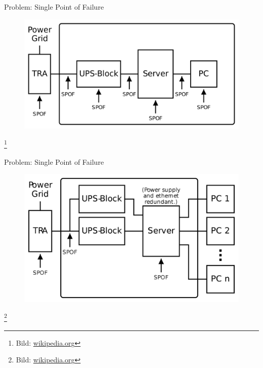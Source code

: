 \documentclass[10pt]{beamer}
\newcommand\blfootnote[1]{%
	\begingroup
	\renewcommand\thefootnote{}\footnote{#1}%
	\addtocounter{footnote}{-1}%
	\endgroup
}
\begin{document}
%
%
\begin{frame}[fragile]{Problem: Single Point of Failure}
	\begin{figure}
	\includegraphics[width=1\textwidth]{images/spof1}
\end{figure}
\blfootnote{Bild: \href{https://de.wikipedia.org/wiki/Single_Point_of_Failure}{wikipedia.org}}
\end{frame}

\begin{frame}[fragile]{Problem: Single Point of Failure}
\begin{figure}
	\includegraphics[width=1\textwidth]{images/spof2}
\end{figure}
\blfootnote{Bild: \href{https://de.wikipedia.org/wiki/Single_Point_of_Failure}{wikipedia.org}}
\end{frame}
\end{document}
